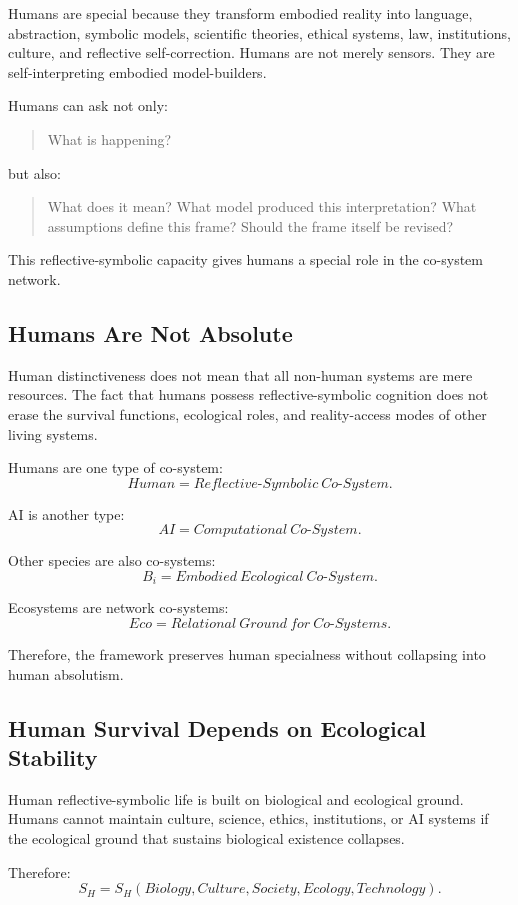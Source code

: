 \documentclass[11pt,a4paper]{article}
\begin{document}
Humans are special because they transform embodied reality into language, abstraction, symbolic models, scientific theories, ethical systems, law, institutions, culture, and reflective self-correction. Humans are not merely sensors. They are self-interpreting embodied model-builders.

Humans can ask not only:
\begin{quote}
What is happening?
\end{quote}
but also:
\begin{quote}
What does it mean? What model produced this interpretation? What assumptions define this frame? Should the frame itself be revised?
\end{quote}

This reflective-symbolic capacity gives humans a special role in the co-system network.

\subsection{Humans Are Not Absolute}

Human distinctiveness does not mean that all non-human systems are mere resources. The fact that humans possess reflective-symbolic cognition does not erase the survival functions, ecological roles, and reality-access modes of other living systems.

Humans are one type of co-system:
\[
Human = Reflective\text{-}Symbolic\ Co\text{-}System.
\]

AI is another type:
\[
AI = Computational\ Co\text{-}System.
\]

Other species are also co-systems:
\[
B_i = Embodied\ Ecological\ Co\text{-}System.
\]

Ecosystems are network co-systems:
\[
Eco = Relational\ Ground\ for\ Co\text{-}Systems.
\]

Therefore, the framework preserves human specialness without collapsing into human absolutism.

\subsection{Human Survival Depends on Ecological Stability}

Human reflective-symbolic life is built on biological and ecological ground. Humans cannot maintain culture, science, ethics, institutions, or AI systems if the ecological ground that sustains biological existence collapses.

Therefore:
\[
S_H
=
S_H(
Biology,
Culture,
Society,
Ecology,
Technology
).
\]
\end{document}
